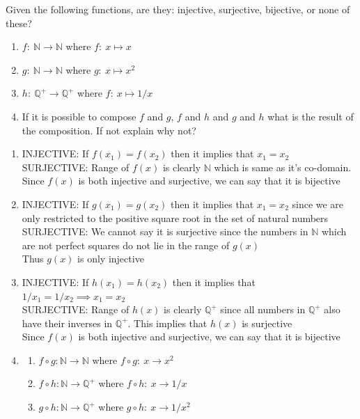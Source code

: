 \documentclass[12pt]{article}
\newcommand{\N}{\mathbb{N}}
\newcommand{\Q}{\mathbb{Q}}
\newenvironment{solution}[2][Solution]{ \begin{trivlist}
\item[\hskip \labelsep {\bfseries #1}]}{\end{trivlist}}
\newenvironment{problem}[2][Problem]{\begin{trivlist}
\item[\hskip \labelsep {\bfseries #1}\hskip \labelsep {\bfseries #2.}]}{\end{trivlist}}
\begin{document}
\begin{problem}{5}Given the following functions, are they: injective, surjective, bijective, or none of these?
\item[]
\begin{enumerate}[label=\alph*)]
    \item $ f \colon \ \N \longrightarrow \N$ where
    $ f \colon \ x \mapsto x$
    \item $ g \colon \ \N \longrightarrow \N$ where
    $ g \colon \ x \mapsto x^2$
    \item $h \colon \ \Q^+ \longrightarrow \Q^+$ where
    $ f \colon \ x \mapsto 1/x$
    \item If it is possible to compose $f$ and $g$, $f$ and $h$ and $g$ and $h$ what is the result of the composition. If not explain why not?
\end{enumerate}
\end{problem}
\begin{solution}{5}
\item[]
\begin{enumerate}[label=\alph*)]
    \item
    INJECTIVE:
        If $f(x_1) = f(x_2)$ then it implies that $x_1 = x_2$\\
    SURJECTIVE:
        Range of $f(x)$ is clearly $\N$ which is same as it's co-domain.\\
    Since $f(x)$ is both injective and surjective, we can say that it is bijective
    \item
    INJECTIVE:
        If $g(x_1) = g(x_2)$ then it implies that $x_1 = x_2$ since we are only restricted to the positive square root in the set of natural numbers \\
    SURJECTIVE: We cannot say it is surjective since the numbers in $\N$ which are not perfect squares do not lie in the range of $g(x)$ \\
    Thus $g(x)$ is only injective
    \item
    INJECTIVE:
        If $h(x_1) = h(x_2)$ then it implies that $1/x_1 = 1/x_2 \implies x_1 = x_2$\\
    SURJECTIVE:
        Range of $h(x)$ is clearly $\Q^+$ since all numbers in $\Q^+$ also have their inverses in $\Q^+$. This implies that $h(x)$ is surjective\\
    Since $f(x)$ is both injective and surjective, we can say that it is bijective
    \item
    \begin{enumerate}[label=(\roman*)]
        \item $f \circ g \colon \N \longrightarrow \N$ where $ f \circ g \colon \ x \longrightarrow x^2$
        \item $f \circ h \colon \N \longrightarrow \Q^+$ where $ f \circ h \colon \ x \longrightarrow 1/x$
        \item $g \circ h \colon \N \longrightarrow \Q^+$ where $ g \circ h \colon \ x \longrightarrow 1/x^2$
    \end{enumerate}
\end{enumerate}
\end{solution}
\end{document}
